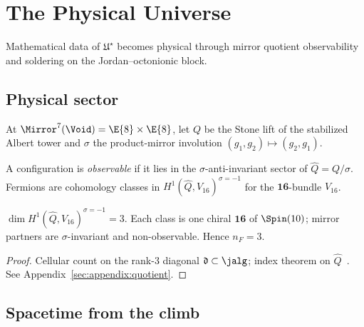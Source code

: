 \section{The Physical Universe}
\label{sec:physics}

Mathematical data of $\mathfrak{U}^\star$ becomes physical through mirror
quotient observability and soldering on the Jordan--octonionic block.

\subsection{Physical sector}
\label{sec:physics:sector}

At $\Mirror^7(\Void)=\E{8}\times\E{8}$, let $Q$ be the Stone lift of the
stabilized Albert tower and $\sigma$ the product-mirror involution
$(g_1,g_2)\mapsto(g_2,g_1)$.

\begin{definition}\label{def:physical}
A configuration is \emph{observable} if it lies in the $\sigma$-anti-invariant
sector of $\hat Q=Q/\sigma$. Fermions are cohomology classes in
$H^1(\hat Q,V_{16})^{\sigma=-1}$ for the $\mathbf{16}$-bundle $V_{16}$.
\end{definition}

\begin{theorem}\label{thm:three-families}
$\dim H^1(\hat Q,V_{16})^{\sigma=-1}=3$. Each class is one chiral
$\mathbf{16}$ of $\Spin(10)$; mirror partners are $\sigma$-invariant and
non-observable. Hence $n_F=3$.
\end{theorem}

\begin{proof}
Cellular count on the rank-$3$ diagonal $\mathfrak{d}\subset\jalg$; index
theorem on $\hat Q$~\cite{AtiyahBott1966}. See Appendix~\ref{sec:appendix:quotient}.
\end{proof}

\subsection{Spacetime from the climb}
\label{sec:physics:spacetime}

